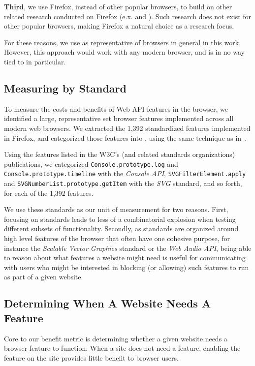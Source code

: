 \textbf{Third}, we use Firefox, instead of other popular browsers, to build on
other related research conducted on Firefox (e.x. \cite{snyder2016browser} and
\cite{shin2011evaluating}).  Such research does not exist for other popular
browsers, making Firefox a natural choice as a research focus.

For these reasons, we use \FFWithVersion as representative of browsers in
general in this work.  However, this approach would work with any modern browser,
and is in no way tied to  \FFWithVersion in particular.


\subsection{Measuring by Standard}
To measure the costs and benefits of Web API features in the browser, we identified
a large, representative set browser features implemented across
all modern web browsers.  We extracted the 1,392 standardized \WA features
implemented in Firefox, and categorized those features into
\NumStandards \WASs, using the same technique as in~\cite{snyder2016browser}.

Using the features listed in the W3C's
(and related standards organizations) publications, we categorized \texttt{Console.prototype.log}
and \texttt{Console.prototype.timeline} with the \emph{Console API},
\texttt{SVGFilterElement.apply} and \texttt{SVGNumberList.prototype.getItem} with
the \emph{SVG} standard, and so forth, for each of the 1,392 features.

We use these \NumStandards standards as our unit of \WA measurement for two
reasons.  First, focusing on \NumStandards standards leads to less of a combinatorial explosion when
testing different subsets of \WA functionality.  Secondly, as
standards are organized around high level features of the browser that often
have one cohesive purpose, for instance the \emph{Scalable Vector Graphics} standard or the \emph{Web
Audio API}, being able to reason about what features a website might need is
useful for communicating with users who
might be interested in blocking (or allowing) such features to run as part of a
given website.

\subsection{Determining When A Website Needs A Feature}
\label{cost-benefit:methodology:manual-inspection}

Core to our benefit metric is determining whether a given website
needs a browser feature to function.  When a site does not need a feature,
enabling the feature on the site provides little benefit to browser users.

